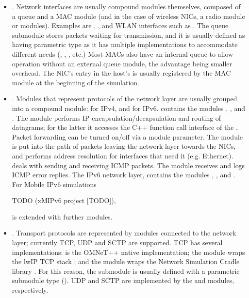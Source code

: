 \begin{itemize}
\item {}. Network interfaces are usually compound modules
themselves, composed of a queue and a MAC module (and in the case of
wireless NICs, a radio module or modules). Examples are
, , and WLAN interfaces
such as . The queue submodule stores packets
waiting for transmission, and it is usually defined as having parametric
type as it has multiple implementations to accommodate different needs
(, , ,
etc.) Most MACs also have an internal queue to allow operation without an
external queue module, the advantage being smaller overhead. The NIC's
entry in the host's  is usually registered by the
MAC module at the beginning of the simulation.

\item {}. Modules that represent protocols of the network
layer are usually grouped into a compound module: 
for IPv4, and  for IPv6. 
contains the modules , ,  and
. The  module performs IP
encapsulation/decapsulation and routing of datagrams; for the latter it
accesses the C++ function call interface of the .
Packet forwarding can be turned on/off via a module parameter. The
 module is put into the path of packets leaving the network
layer towards the NICs, and performs address resolution for interfaces that
need it (e.g. Ethernet).  deals with sending and receiving
ICMP packets. The  module receives and logs ICMP
error replies. The IPv6 network layer,  contains the
modules , , 
and . For Mobile IPv6 simulations 

\ifdraft TODO
(xMIPv6 project [TODO]),
\fi

 is extended with further modules.

\item {}. Transport protocols are represented
by modules connected to the network layer; currently TCP, UDP and SCTP are
supported. TCP has several implementations:  is the OMNeT++
native implementation; the  module wraps the lwIP TCP
stack \ifdraft [TODO] \fi; and the  module wraps the Network
Simulation Cradle library \ifdraft [TODO] \fi. For this reason, the  
submodule is usually defined with a parametric submodule type (). UDP and SCTP are implemented by the  and
 modules, respectively.


\end{itemize}
